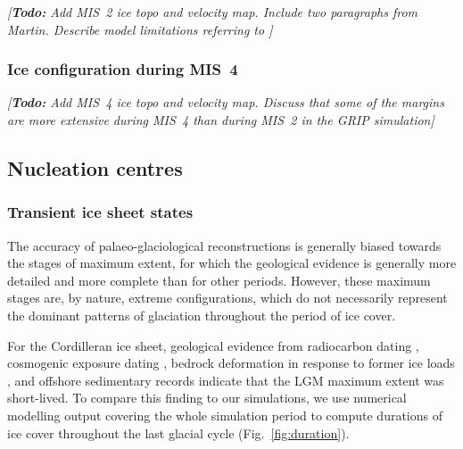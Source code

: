 \documentclass[tc, manuscript]{copernicus}
\newcommand{\todo}[1]{\emph{[\textbf{Todo:} #1]}}
\begin{document}
\todo{Add MIS~2 ice topo and velocity map. Include two paragraphs from Martin.
      Describe model limitations referring to \citet{Seguinot.etal.2014}}

\subsubsection{Ice configuration during MIS~4}

\todo{Add MIS~4 ice topo and velocity map. Discuss that some of the margins
      are more extensive during MIS~4 than during MIS~2 in the GRIP simulation}

\subsection{Nucleation centres}

\subsubsection{Transient ice sheet states}

The accuracy of palaeo-glaciological reconstructions is generally biased
towards the stages of maximum extent, for which the geological evidence is
generally more detailed and more complete than for other periods. However,
these maximum stages are, by nature, extreme configurations, which do not
necessarily represent the dominant patterns of glaciation throughout the period
of ice cover.

For the Cordilleran ice sheet, geological evidence from radiocarbon dating
    \citep{Clague.etal.1980, Clague.1985, Clague.1986, Porter.Swanson.1998,
           Menounos.etal.2008},
cosmogenic exposure dating
    \citep{Stroeven.etal.2010, Stroeven.etal.2014, Margold.etal.2014},
bedrock deformation in response to former ice loads
    \citep{Clague.James.2002, Clague.etal.2005},
and offshore sedimentary records
    \citep{Cosma.etal.2008, Davies.etal.2011}
indicate that the LGM maximum extent was short-lived. To compare this finding
to our simulations, we use numerical modelling output covering the whole
simulation period to compute durations of ice cover throughout the last glacial
cycle (Fig.~\ref{fig:duration}).
\end{document}
